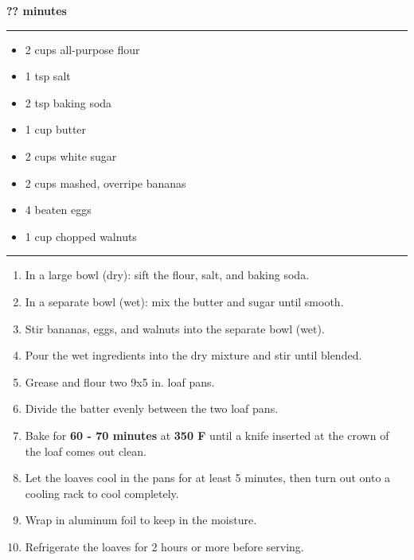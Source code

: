  \hfill {\large \textbf{?? minutes}}

\vspace{15pt} \hrule \vspace{15pt}
\begin{itemize}
	\item 2 cups all-purpose flour
	\item 1 tsp salt
	\item 2 tsp baking soda
	\item 1 cup butter
	\item 2 cups white sugar
	\item 2 cups mashed, overripe bananas
	\item 4 beaten eggs
	\item 1 cup chopped walnuts
\end{itemize}

\vspace{15pt} \hrule \vspace{15pt}
\begin{enumerate}
	\item In a large bowl (dry): sift the flour, salt, and baking soda.
	\item In a separate bowl (wet): mix the butter and sugar until smooth.
	\item Stir bananas, eggs, and walnuts into the separate bowl (wet).
	\item Pour the wet ingredients into the dry mixture and stir until blended.
	\item Grease and flour two 9x5 in. loaf pans.
	\item Divide the batter evenly between the two loaf pans.
	\item Bake for \textbf{60 - 70 minutes} at \textbf{350 F} until a knife inserted at the crown of the loaf comes out clean.
	\item Let the loaves cool in the pans for at least 5 minutes, then turn out onto a cooling rack to cool completely.
	\item Wrap in aluminum foil to keep in the moisture.
	\item Refrigerate the loaves for 2 hours or more before serving.
\end{enumerate}

